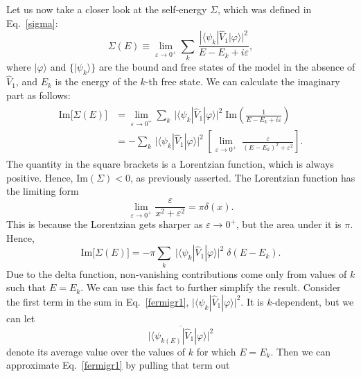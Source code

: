 \documentclass[pra,12pt]{revtex4}
\begin{document}
Let us now take a closer look at the self-energy $\Sigma$, which was defined in
Eq.~\eqref{sigma}:
\begin{equation}
  \Sigma(E) \equiv \lim_{\varepsilon\rightarrow0^+} \sum_k\, \frac{\displaystyle| \langle\psi_k| \hat{V}_1|\varphi\rangle|^2}{\displaystyle E-E_k+i\varepsilon},
\end{equation}
where $|\varphi\rangle$ and $\{|\psi_k\rangle\}$ are the bound and
free states of the model in the absence of $\hat{V}_1$, and $E_k$ is
the energy of the $k$-th free state.  We can calculate the imaginary
part as follows:
\begin{align}
  \begin{aligned}\mathrm{Im}\big[\Sigma(E)\big] &= \lim_{\varepsilon\rightarrow0^+} \sum_k\, \Big| \langle\psi_k| \hat{V}_1|\varphi\rangle\Big|^2 \; \mathrm{Im}\left( \frac{1}{\displaystyle E-E_k+i\varepsilon}\right) \\ &= - \sum_k\, \Big| \langle\psi_k| \hat{V}_1|\varphi\rangle\Big|^2 \; \left[ \lim_{\varepsilon\rightarrow0^+} \; \frac{\varepsilon}{\displaystyle (E-E_k)^2 + \varepsilon^2}\right].\end{aligned}
\end{align}
The quantity in the square brackets is a Lorentzian function, which is
always positive.  Hence, $\mathrm{Im}(\Sigma) < 0$, as previously
asserted.  The Lorentzian function has the limiting form
\begin{equation}
  \lim_{\varepsilon\rightarrow 0^+} \frac{\varepsilon}{x^2+\varepsilon^2} = \pi\delta(x).
\end{equation}
This is because the Lorentzian gets sharper as $\varepsilon\rightarrow0^+$,
but the area under it is $\pi$.  Hence,
\begin{equation}
  \mathrm{Im}\big[\Sigma(E)\big]
  = - \pi \sum_k \; \big| \langle\psi_k| \hat{V}_1|\varphi\rangle\big|^2
  \; \delta(E-E_k).
  \label{fermigr1}
\end{equation}
Due to the delta function, non-vanishing contributions come only from
values of $k$ such that $E = E_k$.  We can use this fact to further
simplify the result.  Consider the first term in the sum in
Eq.~\eqref{fermigr1}, $\big| \langle\psi_k|
\hat{V}_1|\varphi\rangle\big|^2$.  It is $k$-dependent, but we can let
\begin{equation*}
  \overline{\big| \langle\psi_{k(E)}| \hat{V}_1|\varphi\rangle\big|^2}
\end{equation*}
denote its average value over the values of $k$ for which $E = E_k$.
Then we can approximate Eq.~\eqref{fermigr1} by pulling that term out
\end{document}
